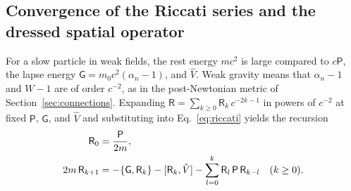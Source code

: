 \documentclass[aps,prd,onecolumn,tightenlines,nofootinbib,notitlepage,11pt,floatfix]{revtex4-2}
\theoremstyle{indentedtheorem}
\begin{document}
\subsection{Convergence of the Riccati series and the dressed spatial operator}
\label{sec:riccati_convergence}

For a slow particle in weak fields, the rest energy $mc^2$ is large compared to $c\mathsf{P}$, the lapse energy $\mathsf{G} = m_0c^2(\alpha_n-1)$, and $\hat{V}$. Weak gravity means that $\alpha_n-1$ and $W-1$ are of order $c^{-2}$, as in the post-Newtonian metric of Section~\ref{sec:connections}. Expanding $\mathsf{R} = \sum_{k\ge 0}\mathsf{R}_k\,c^{-2k-1}$ in powers of $c^{-2}$ at fixed $\mathsf{P}$, $\mathsf{G}$, and $\hat{V}$ and substituting into Eq.~\eqref{eq:riccati} yields the recursion
\begin{align}
    \mathsf{R}_0 &= \frac{\mathsf{P}}{2m} , \notag\\
    2m\,\mathsf{R}_{k+1} &= -\{\mathsf{G},\mathsf{R}_k\} - [\mathsf{R}_k,\hat{V}] - \sum_{l=0}^{k}\mathsf{R}_l\,\mathsf{P}\,\mathsf{R}_{k-l} \quad (k\ge 0) .
    \label{eq:riccati_recursion}
\end{align}
\end{document}
